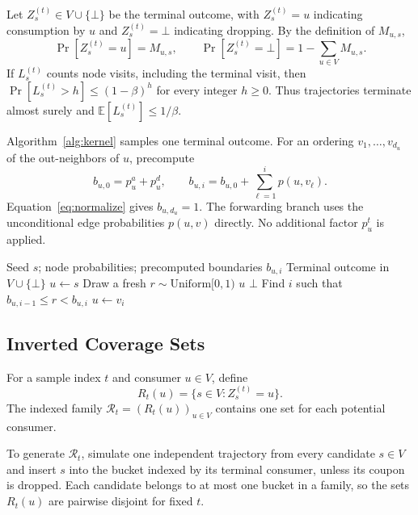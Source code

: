 \documentclass[sigconf]{acmart}
\begin{document}
Let $Z_s^{(t)}\in V\cup\{\bot\}$ be the terminal outcome, with
$Z_s^{(t)}=u$ indicating consumption by $u$ and $Z_s^{(t)}=\bot$
indicating dropping. By the definition of $M_{u,s}$,
\begin{equation}
\label{eq:endpoint-law}
  \Pr[Z_s^{(t)}=u]=M_{u,s},\qquad
  \Pr[Z_s^{(t)}=\bot]=1-\sum_{u\in V}M_{u,s}.
\end{equation}
If $L_s^{(t)}$ counts node visits, including the terminal visit,
then $\Pr[L_s^{(t)}>h]\le(1-\beta)^h$ for every integer $h\ge0$.
Thus trajectories terminate almost surely and
$\mathbb E[L_s^{(t)}]\le1/\beta$.

Algorithm~\ref{alg:kernel} samples one terminal outcome. For an ordering
$v_1,\ldots,v_{d_u}$ of the out-neighbors of $u$, precompute
\[
 b_{u,0}=p_u^a+p_u^d,\qquad
 b_{u,i}=b_{u,0}+\sum_{\ell=1}^{i}p(u,v_\ell).
\]
Equation~\eqref{eq:normalize} gives $b_{u,d_u}=1$.
The forwarding branch uses the unconditional edge probabilities
$p(u,v)$ directly. No additional factor $p_u^t$ is applied.

\begin{algorithm}[t]
\caption{\textsc{SampleTerminalConsumer}$(s)$}
\label{alg:kernel}
\begin{algorithmic}[1]
\Require Seed $s$; node probabilities; precomputed boundaries $b_{u,i}$
\Ensure Terminal outcome in $V\cup\{\bot\}$
\State $u\gets s$
  \State Draw a fresh $r\sim\mathrm{Uniform}[0,1)$
    \State \Return $u$
    \State \Return $\bot$
  \Else
    \State Find $i$ such that $b_{u,i-1}\le r<b_{u,i}$
    \State $u\gets v_i$
  \EndIf
\EndWhile
\end{algorithmic}
\end{algorithm}

\subsection{Inverted Coverage Sets}
\label{sec:reverse-coverage}

\begin{definition}
For a sample index $t$ and consumer $u\in V$, define
\begin{equation}
\label{eq:reverse-set-def}
  R_t(u)=\{s\in V:Z_s^{(t)}=u\}.
\end{equation}
The indexed family $\mathcal R_t=(R_t(u))_{u\in V}$ contains one
set for each potential consumer.
\end{definition}

To generate $\mathcal R_t$, simulate one independent trajectory
from every candidate $s\in V$ and insert $s$ into the bucket
indexed by its terminal consumer, unless its coupon is dropped.
Each candidate belongs to at most one bucket in a family, so the
sets $R_t(u)$ are pairwise disjoint for fixed $t$.
\end{document}
